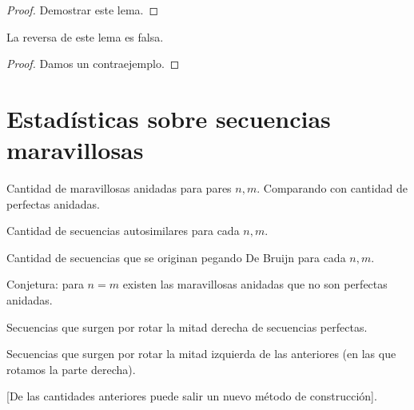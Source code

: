 \begin{proof}
  Demostrar este lema.
\end{proof}

\begin{prop}
  La reversa de este lema es falsa.
\end{prop}

\begin{proof}
  Damos un contraejemplo.
\end{proof}

\section{Estadísticas sobre secuencias maravillosas}

Cantidad de maravillosas anidadas para pares $n, m$. Comparando con cantidad de perfectas anidadas.

Cantidad de secuencias autosimilares para cada $n, m$.

Cantidad de secuencias que se originan pegando De Bruijn para cada $n, m$.

Conjetura: para $n = m$ existen las maravillosas anidadas que no son perfectas anidadas.

Secuencias que surgen por rotar la mitad derecha de secuencias perfectas.

Secuencias que surgen por rotar la mitad izquierda de las anteriores (en las que rotamos la parte derecha).

  [De las cantidades anteriores puede salir un nuevo método de construcción].
